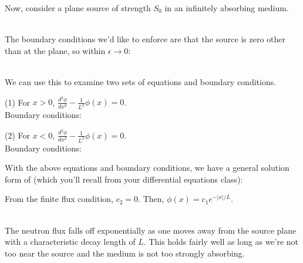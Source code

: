 \documentclass[12pt]{article}
\newif\ifeqns
\newcommand{\rvec}{\ensuremath{\vec{r}}}
\begin{document}
Now, consider a plane source of strength $S_0$ in an infinitely absorbing medium.
\ifeqns
\begin{align*}
\phi(\rvec) &= \phi(x)\\
%
\frac{d^2\phi(x)}{dx^2} &- \frac{1}{L^2}\phi(x) = -\frac{S_0\delta(x)}{D}
\end{align*}
\else
\vspace*{6em}\\
\fi
The boundary conditions we'd like to enforce are that the source is zero other than at the plane, so within $\epsilon \rightarrow 0$:
%
\ifeqns
\[-D \frac{d \phi}{dx}|_{+\epsilon} + D \frac{d \phi}{dx}|_{-\epsilon} = 
J_x(0^+) - J_x(0^-) = S_0\:.\]
\else
\vspace*{3em}\\
\fi
%
We can use this to examine two sets of equations and boundary conditions.


(1) For $x > 0$, $\frac{d^2\phi}{dx^2} - \frac{1}{L^2}\phi(x) = 0$.\\
%
Boundary conditions: 
\ifeqns
\begin{align*}
&\lim\limits_{x\rightarrow 0^+}\vec{J}(x) = \frac{S_0}{2}, \: \\
%
&\lim\limits_{x\rightarrow +\infty}|\phi(x)|<\infty, \: \phi(x) \geq 0
\end{align*}
\else
\vspace*{5em}
\fi

(2) For $x < 0$, \: $\frac{d^2\phi}{dx^2} - \frac{1}{L^2}\phi(x) = 0$.\\
%
Boundary conditions: 
\ifeqns
\begin{align*}
&\lim\limits_{x\rightarrow 0^-}\vec{J}(x) = -\frac{S_0}{2}\:, \\
%
&\lim\limits_{x\rightarrow -\infty}|\phi(x)|<\infty, \phi(x) \geq 0
\end{align*}
\else
\vspace*{5em}
\fi


With the above equations and boundary conditions, we have a general solution form of (which you'll recall from your differential equations class):
%
\ifeqns
\begin{equation*}
\phi(x) = c_1e^{-|x|/L} + c_2e^{|x|/L}.
\end{equation*}
\else
\vspace*{3em}
\fi

From the finite flux condition, $c_2 = 0$. Then, $\phi(x) = c_1e^{-|x|/L}$.
\ifeqns
\begin{align*}
\lim\limits_{x\to 0^+} \vec{J}(x) &= \lim\limits_{x\to 0^+}\left(\frac{D}{L}c_1e^{-|x|/L}\right) = 
\frac{D}{L}c_1 = \frac{S_0}{2}\\
%
c_1 &= \frac{S_0 L}{2D}\\
%
\phi(x) &= \boxed{\frac{S_0L}{2D}e^{-|x|/L}}
\end{align*}
\else
\vspace*{9em}\\
\fi
The neutron flux falls off exponentially as one moves away from the source plane with a characteristic decay length of $L$. This holds fairly well as long as we're not too near the source and the medium is not too strongly absorbing.
\end{document}
